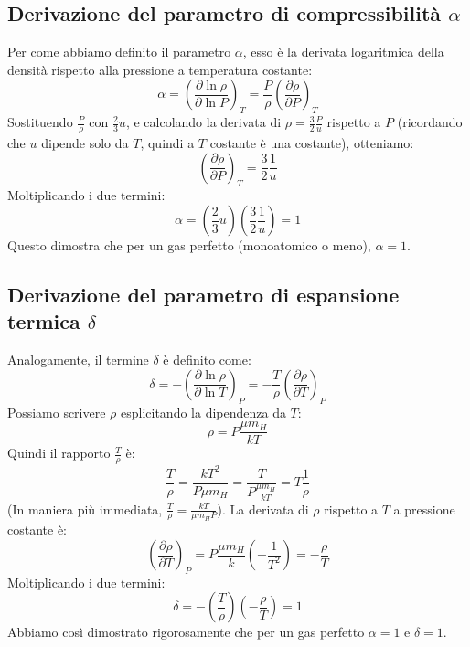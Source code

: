 \subsection{Derivazione del parametro di compressibilità $\alpha$}
Per come abbiamo definito il parametro $\alpha$, esso è la derivata logaritmica della densità rispetto alla pressione a temperatura costante:
\begin{equation}
\alpha = \left( \frac{\partial \ln \rho}{\partial \ln P} \right)_T = \frac{P}{\rho} \left( \frac{\partial \rho}{\partial P} \right)_T
\end{equation}
Sostituendo $\frac{P}{\rho}$ con $\frac{2}{3}u$, e calcolando la derivata di $\rho = \frac{3}{2}\frac{P}{u}$ rispetto a $P$ (ricordando che $u$ dipende solo da $T$, quindi a $T$ costante è una costante), otteniamo:
\begin{equation}
\left( \frac{\partial \rho}{\partial P} \right)_T = \frac{3}{2} \frac{1}{u}
\end{equation}
Moltiplicando i due termini:
\begin{equation}
\alpha = \left( \frac{2}{3} u \right) \left( \frac{3}{2} \frac{1}{u} \right) = 1
\end{equation}
Questo dimostra che per un gas perfetto (monoatomico o meno), $\alpha = 1$.

\subsection{Derivazione del parametro di espansione termica $\delta$}
Analogamente, il termine $\delta$ è definito come:
\begin{equation}
\delta = - \left( \frac{\partial \ln \rho}{\partial \ln T} \right)_P = - \frac{T}{\rho} \left( \frac{\partial \rho}{\partial T} \right)_P
\end{equation}
Possiamo scrivere $\rho$ esplicitando la dipendenza da $T$:
\begin{equation}
\rho = P \frac{\mu m_H}{k T}
\end{equation}
Quindi il rapporto $\frac{T}{\rho}$ è:
\begin{equation}
\frac{T}{\rho} = \frac{k T^2}{P \mu m_H} = \frac{T}{P \frac{\mu m_H}{k T}} = T \frac{1}{\rho}
\end{equation}
(In maniera più immediata, $\frac{T}{\rho} = \frac{k T}{\mu m_H P}$).
La derivata di $\rho$ rispetto a $T$ a pressione costante è:
\begin{equation}
\left( \frac{\partial \rho}{\partial T} \right)_P = P \frac{\mu m_H}{k} \left( -\frac{1}{T^2} \right) = - \frac{\rho}{T}
\end{equation}
Moltiplicando i due termini:
\begin{equation}
\delta = - \left( \frac{T}{\rho} \right) \left( - \frac{\rho}{T} \right) = 1
\end{equation}
Abbiamo così dimostrato rigorosamente che per un gas perfetto $\alpha = 1$ e $\delta = 1$.

